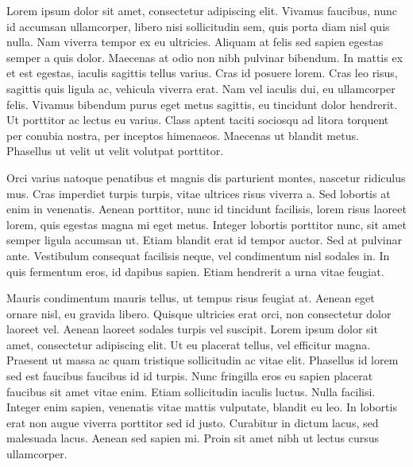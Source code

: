 
Lorem ipsum dolor sit amet, consectetur adipiscing elit. Vivamus faucibus, nunc id accumsan ullamcorper, libero nisi sollicitudin sem, quis porta diam nisl quis nulla. Nam viverra tempor ex eu ultricies. Aliquam at felis sed sapien egestas semper a quis dolor. Maecenas at odio non nibh pulvinar bibendum. In mattis ex et est egestas, iaculis sagittis tellus varius. Cras id posuere lorem. Cras leo risus, sagittis quis ligula ac, vehicula viverra erat. Nam vel iaculis dui, eu ullamcorper felis. Vivamus bibendum purus eget metus sagittis, eu tincidunt dolor hendrerit. Ut porttitor ac lectus eu varius. Class aptent taciti sociosqu ad litora torquent per conubia nostra, per inceptos himenaeos. Maecenas ut blandit metus. Phasellus ut velit ut velit volutpat porttitor.

Orci varius natoque penatibus et magnis dis parturient montes, nascetur ridiculus mus. Cras imperdiet turpis turpis, vitae ultrices risus viverra a. Sed lobortis at enim in venenatis. Aenean porttitor, nunc id tincidunt facilisis, lorem risus laoreet lorem, quis egestas magna mi eget metus. Integer lobortis porttitor nunc, sit amet semper ligula accumsan ut. Etiam blandit erat id tempor auctor. Sed at pulvinar ante. Vestibulum consequat facilisis neque, vel condimentum nisl sodales in. In quis fermentum eros, id dapibus sapien. Etiam hendrerit a urna vitae feugiat.

Mauris condimentum mauris tellus, ut tempus risus feugiat at. Aenean eget ornare nisl, eu gravida libero. Quisque ultricies erat orci, non consectetur dolor laoreet vel. Aenean laoreet sodales turpis vel suscipit. Lorem ipsum dolor sit amet, consectetur adipiscing elit. Ut eu placerat tellus, vel efficitur magna. Praesent ut massa ac quam tristique sollicitudin ac vitae elit. Phasellus id lorem sed est faucibus faucibus id id turpis. Nunc fringilla eros eu sapien placerat faucibus sit amet vitae enim. Etiam sollicitudin iaculis luctus. Nulla facilisi. Integer enim sapien, venenatis vitae mattis vulputate, blandit eu leo. In lobortis erat non augue viverra porttitor sed id justo. Curabitur in dictum lacus, sed malesuada lacus. Aenean sed sapien mi. Proin sit amet nibh ut lectus cursus ullamcorper.

